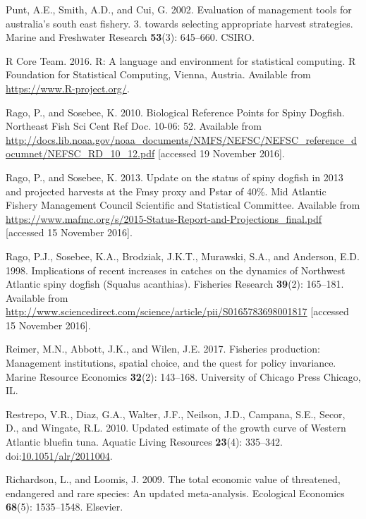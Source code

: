 \documentclass[]{article}
\begin{document}
\hypertarget{ref-punt2002evaluation}{}
Punt, A.E., Smith, A.D., and Cui, G. 2002. Evaluation of management
tools for australia's south east fishery. 3. towards selecting
appropriate harvest strategies. Marine and Freshwater Research
\textbf{53}(3): 645--660. CSIRO.

\hypertarget{ref-Rcite}{}
R Core Team. 2016. R: A language and environment for statistical
computing. R Foundation for Statistical Computing, Vienna, Austria.
Available from \url{https://www.R-project.org/}.

\hypertarget{ref-rago_biological_2010}{}
Rago, P., and Sosebee, K. 2010. Biological Reference Points for Spiny
Dogfish. Northeast Fish Sci Cent Ref Doc. 10-06: 52. Available from
\url{http://docs.lib.noaa.gov/noaa_documents/NMFS/NEFSC/NEFSC_reference_documnet/NEFSC_RD_10_12.pdf}
{[}accessed 19 November 2016{]}.

\hypertarget{ref-rago_update_2013}{}
Rago, P., and Sosebee, K. 2013. Update on the status of spiny dogfish in
2013 and projected harvests at the Fmsy proxy and Pstar of 40\%. Mid
Atlantic Fishery Management Council Scientific and Statistical
Committee. Available from
\url{https://www.mafmc.org/s/2015-Status-Report-and-Projections_final.pdf}
{[}accessed 15 November 2016{]}.

\hypertarget{ref-rago_implications_1998}{}
Rago, P.J., Sosebee, K.A., Brodziak, J.K.T., Murawski, S.A., and
Anderson, E.D. 1998. Implications of recent increases in catches on the
dynamics of Northwest Atlantic spiny dogfish (Squalus acanthias).
Fisheries Research \textbf{39}(2): 165--181. Available from
\url{http://www.sciencedirect.com/science/article/pii/S0165783698001817}
{[}accessed 15 November 2016{]}.

\hypertarget{ref-reimer2017fisheries}{}
Reimer, M.N., Abbott, J.K., and Wilen, J.E. 2017. Fisheries production:
Management institutions, spatial choice, and the quest for policy
invariance. Marine Resource Economics \textbf{32}(2): 143--168.
University of Chicago Press Chicago, IL.

\hypertarget{ref-restrepo_updated_2010}{}
Restrepo, V.R., Diaz, G.A., Walter, J.F., Neilson, J.D., Campana, S.E.,
Secor, D., and Wingate, R.L. 2010. Updated estimate of the growth curve
of Western Atlantic bluefin tuna. Aquatic Living Resources
\textbf{23}(4): 335--342.
doi:\href{https://doi.org/10.1051/alr/2011004}{10.1051/alr/2011004}.

\hypertarget{ref-richardson2009total}{}
Richardson, L., and Loomis, J. 2009. The total economic value of
threatened, endangered and rare species: An updated meta-analysis.
Ecological Economics \textbf{68}(5): 1535--1548. Elsevier.
\end{document}
